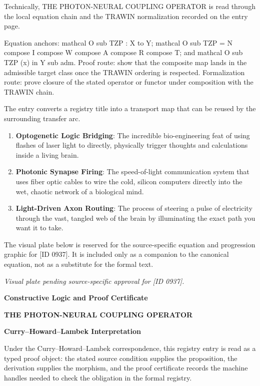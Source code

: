 Technically, THE PHOTON-NEURAL COUPLING OPERATOR is read through the local equation chain and the TRAWIN normalization recorded on the entry page.

Equation anchors: mathcal O sub TZP : X to Y; mathcal O sub TZP = N compose I compose W compose A compose R compose T; and mathcal O sub TZP (x) in Y sub adm. Proof route: show that the composite map lands in the admissible target class once the TRAWIN ordering is respected. Formalization route: prove closure of the stated operator or functor under composition with the TRAWIN chain.

The entry converts a registry title into a transport map that can be reused by the surrounding transfer arc.
\endgroup

\begin{enumerate}[leftmargin=1.6em,itemsep=6pt,topsep=4pt]
\item \textbf{Optogenetic Logic Bridging}: The incredible bio-engineering feat of using flashes of laser light to directly, physically trigger thoughts and calculations inside a living brain.
\item \textbf{Photonic Synapse Firing}: The speed-of-light communication system that uses fiber optic cables to wire the cold, silicon computers directly into the wet, chaotic network of a biological mind.
\item \textbf{Light-Driven Axon Routing}: The process of steering a pulse of electricity through the vast, tangled web of the brain by illuminating the exact path you want it to take.
\end{enumerate}

\begingroup\footnotesize\sloppy
The visual plate below is reserved for the source-specific equation and progression graphic for [ID 0937]. It is included only as a companion to the canonical equation, not as a substitute for the formal text.
\par\endgroup
\begingroup\footnotesize\itshape
Visual plate pending source-specific approval for [ID 0937].
\par\endgroup

\clearpage
\begingroup\tzpsupportsetup
\noindent\textbf{\fontsize{10.8pt}{12.8pt}\selectfont [ID 0937] Constructive Logic and Proof Certificate}\par
\noindent\textbf{\fontsize{10pt}{12pt}\selectfont THE PHOTON-NEURAL COUPLING OPERATOR}\par
\vspace{0.45em}
\begingroup
\footnotesize
\setlength{\parskip}{0.22em}
\setlength{\parindent}{0pt}
\noindent\textbf{Curry--Howard--Lambek Interpretation}\par
Under the Curry--Howard--Lambek correspondence, this registry entry is read as a typed proof
object: the stated source condition supplies the proposition, the derivation supplies the
morphism, and the proof certificate records the machine handles needed to check the obligation
in the formal registry.

